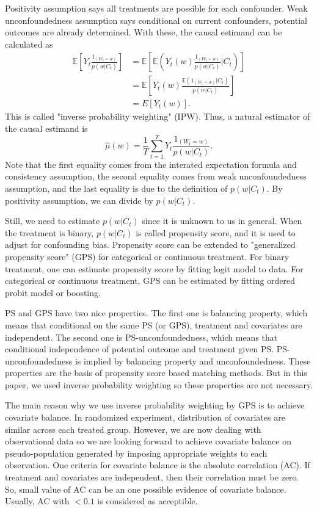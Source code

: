 \documentclass[12pt]{article}
\begin{document}
Positivity assumption says all treatments are possible for each confounder.
Weak unconfoundedness assumption says
conditional on current confounders, potential outcomes are already determined.
With these, the causal estimand can be calculated as
\[
	\begin{split}
		\mathbb{E}\left[ Y_t\frac{1_{(W_t = w)}}{p(w\lvert C_t)} \right]
		& = \mathbb{E}\left[ \mathbb{E}\left( Y_t(w) \frac{1_{(W_t = w)}}{p(w\lvert C_t)} \lvert C_t\right)\right]\\
		& = \mathbb{E}\left[ Y_t(w)\frac{\mathbb{E}\left( 1_{(W_t = w)}\lvert C_t \right)}{p(w\lvert C_t)} \right]\\
		& = E\left[ Y_t(w) \right].
	\end{split}
\]
This is called "inverse probability weighting" (IPW).
Thus, a natural estimator of the causal estimand is
\[
	\hat{\mu}(w) = \frac{1}{T}\sum_{t = 1}^T Y_t \frac{1_{(W_t = w)}}{p(w\lvert C_t)}.	
\]
Note that the first equality comes from the interated expectation formula and consistency assumption,
the second equality comes from weak unconfoundedness assumption,
and the last equality is due to the definition of $p(w\lvert C_t)$.
By positivity assumption, we can divide by $p(w\lvert C_t)$.

Still, we need to estimate $p(w\lvert C_t)$ since it is unknown to us in general.
When the treatment is binary, $p(w\lvert C_t)$ is called propensity score,
and it is used to adjust for confounding bias\cite{rosenbaum1983}.
Propensity score can be extended to 
"generalized propensity score" (GPS) for categorical or continuous treatment\cite{imbens2000}.
For binary treatment, one can estimate propensity score by fitting logit model to data.
For categorical or continuous treatment, GPS can be estimated by fitting ordered probit model or boosting.

PS and GPS have two nice properties\cite{rosenbaum1983, hirano2004}.
The first one is balancing property, which means that conditional on the same PS (or GPS),
treatment and covariates are independent.
The second one is PS-unconfoundedness, 
which means that conditional independence of potential outcome and treatment given PS.
PS-unconfoundedness is implied by balancing property and unconfoundedness.
These properties are the basis of propensity score based matching methods.
But in this paper, we used inverse probability weighting so these properties are not necessary.

The main reason why we use inverse probability weighting by GPS is to achieve covariate balance.
In randomized experiment, distribution of covariates are similar across each treated group.
However, we are now dealing with observational data 
so we are looking forward to achieve covariate balance on pseudo-population generated by
imposing appropriate weights to each observation.
One criteria for covariate balance is the absolute correlation (AC)\cite{gpsboosting2015}.
If treatment and covariates are independent, then their correlation must be zero.
So, small value of AC can be an one possible evidence of covariate balance.
Usually, AC with $ <0.1 $ is considered as acceptible.
\end{document}
